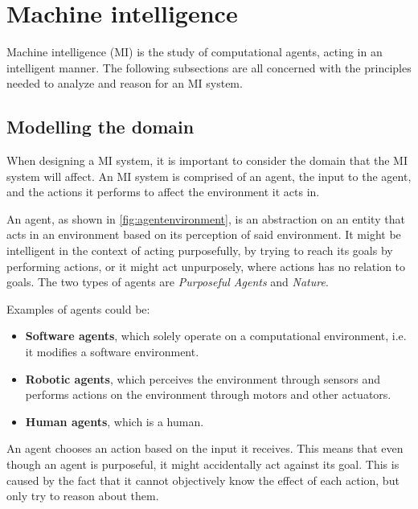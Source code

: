 \section{Machine intelligence}\label{theory:machineintelligence}
Machine intelligence (MI) is the study of computational agents, acting in an intelligent manner.
The following subsections are all concerned with the principles needed to analyze and reason for an MI system.

\subsection{Modelling the domain}\label{Theory:MIModelling}
When designing a MI system, it is important to consider the domain that the MI system will affect.
An MI system is comprised of an agent, the input to the agent, and the actions it performs to affect the environment it acts in.


An agent, as shown in \autoref{fig:agentenvironment}, is an abstraction on an entity that acts in an environment based on its perception of said environment\cite{ArtificialIntelligencealanpoole}.
It might be intelligent in the context of acting purposefully, by trying to reach its goals by performing actions, or it might act unpurposely, where actions has no relation to goals.
The two types of agents are \textit{Purposeful Agents} and \textit{Nature}.

Examples of agents could be:
\begin{itemize}
	\item \textbf{Software agents}, which solely operate on a computational environment, i{.}e{.} it modifies a software environment.
	\item \textbf{Robotic agents}, which perceives the environment through sensors and performs actions on the environment through motors and other actuators.
	\item \textbf{Human agents}, which is a human. 
\end{itemize}

An agent chooses an action based on the input it receives.
This means that even though an agent is purposeful, it might accidentally act against its goal.
This is caused by the fact that it cannot objectively know the effect of each action, but only try to reason about them.

